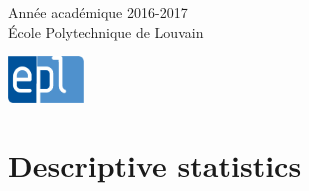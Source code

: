 \documentclass[a4paper]{article}
\begin{document}
\begin{titlepage}

{\large Ann\'ee acad\'emique 2016-2017}\\[0,25cm] 
{\large \'Ecole Polytechnique de Louvain}\\[1cm]


\begin{center}
  \includegraphics[width = 20mm]{img/epl.jpg} \hfill
\end{center}

\vfill %
\end{titlepage}


\section{Descriptive statistics}
\end{document}
